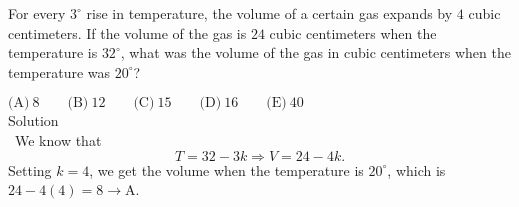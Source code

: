 

For every $3^\circ$ rise in temperature, the volume of a certain gas expands by $4$ cubic centimeters. If the volume of the gas is $24$ cubic centimeters when the temperature is $32^\circ$, what was the volume of the gas in cubic centimeters when the temperature was $20^\circ$?

$\text{(A)}\ 8 \qquad \text{(B)}\ 12 \qquad \text{(C)}\ 15 \qquad \text{(D)}\ 16 \qquad \text{(E)}\ 40$
\\
Solution
\\\
We know that \[T=32-3k\Rightarrow V=24-4k.\] Setting $k=4$, we get the volume when the temperature is $20^\circ$, which is $24-4(4)=8\rightarrow \boxed{\text{A}}$.


